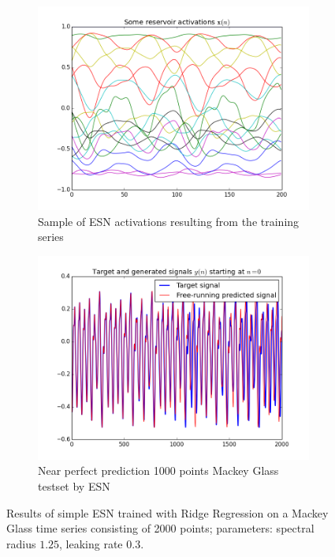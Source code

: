 \begin{figure}[!ht]
    \centering
        \begin{subfigure}[b]{.45\textwidth}
        \centering
        \includegraphics[width=\textwidth]{./img/plots/esn/mg/resact.png}
        \caption{Sample of ESN activations resulting from the training series}
        \label{subfig:mg_act}
        \end{subfigure}
        \quad 
        \begin{subfigure}[b]{.45\textwidth}
        \centering
        \includegraphics[width=\textwidth]{./img/plots/esn/mg/pred1000_br.png}
        \caption{Near perfect prediction 1000 points Mackey Glass testset by ESN}
        \label{subfig:mg_pred}
        \end{subfigure}
    \caption{Results of simple ESN trained with Ridge Regression on a Mackey Glass time series consisting of 2000 points; parameters: spectral radius $1.25$, leaking rate $0.3$.}
    \label{fig:mackeyglass}
\end{figure}

